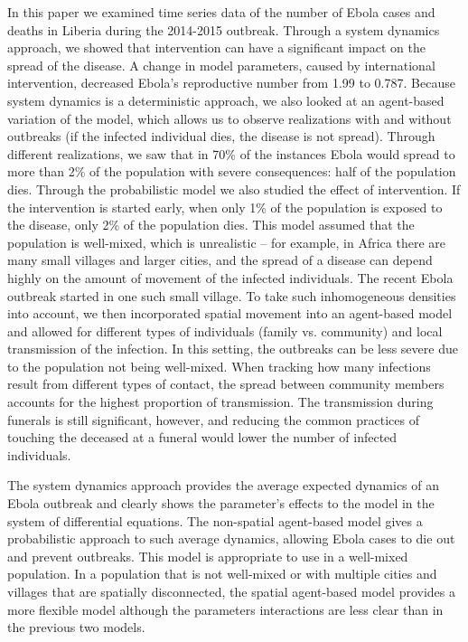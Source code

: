 In this paper we examined time series data of the number of Ebola cases and deaths in Liberia during the 2014-2015 outbreak. Through a system dynamics approach, we showed that intervention can have a significant impact on the spread of the disease. A change in model parameters, caused by international intervention, decreased Ebola's reproductive number from 1.99 to 0.787. Because system dynamics is a deterministic approach, we also looked at an agent-based variation of the model, which allows us to observe realizations with and without outbreaks (if the infected individual dies, the disease is not spread). Through different realizations, we saw that in 70\% of the instances Ebola would spread to more than 2\% of the population with severe consequences: half of the population dies. Through the probabilistic model we also studied the effect of intervention. If the intervention is started early, when only 1\% of the population is exposed to the disease, only 2\% of the population dies. This model assumed that the population is well-mixed, which is unrealistic -- for example, in Africa there are many small villages and larger cities, and the spread of a disease can depend highly on the amount of movement of the infected individuals. The recent Ebola outbreak started in one such small village. To take such inhomogeneous densities into account, we then incorporated spatial movement into an agent-based model and allowed for different types of individuals (family vs. community) and local transmission of the infection. In this setting, the outbreaks can be less severe due to the population not being well-mixed. When tracking how many infections result from different types of contact, the spread between community members accounts for the highest proportion of transmission. The transmission during funerals is still significant, however, and reducing the common practices of touching the deceased at a funeral would lower the number of infected individuals. 

The system dynamics approach provides the average expected dynamics of an Ebola outbreak and clearly shows the parameter's effects to the model in the system of differential equations. The non-spatial agent-based model gives a probabilistic approach to such average dynamics, allowing Ebola cases to die out and prevent outbreaks. This model is appropriate to use in a well-mixed population. In a population that is not well-mixed or with multiple cities and villages that are spatially disconnected, the spatial agent-based model provides a more flexible model although the parameters interactions are less clear than in the previous two models.

